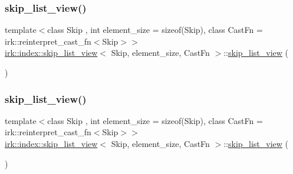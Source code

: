 \subsubsection{\texorpdfstring{skip\+\_\+list\+\_\+view()}{skip\_list\_view()}\hspace{0.1cm}{\footnotesize\ttfamily [1/4]}}
{\footnotesize\ttfamily template$<$class Skip , int element\+\_\+size = sizeof(\+Skip), class Cast\+Fn  = irk\+::reinterpret\+\_\+cast\+\_\+fn$<$\+Skip$>$$>$ \\
\mbox{\hyperlink{classirk_1_1index_1_1skip__list__view}{irk\+::index\+::skip\+\_\+list\+\_\+view}}$<$ Skip, element\+\_\+size, Cast\+Fn $>$\+::\mbox{\hyperlink{classirk_1_1index_1_1skip__list__view}{skip\+\_\+list\+\_\+view}} (\begin{DoxyParamCaption}{ }\end{DoxyParamCaption})\hspace{0.3cm}{\ttfamily [default]}}

\mbox{\label{classirk_1_1index_1_1skip__list__view_ab77d6c40db66d837d83675767b25f6f8}} 
\subsubsection{\texorpdfstring{skip\+\_\+list\+\_\+view()}{skip\_list\_view()}\hspace{0.1cm}{\footnotesize\ttfamily [2/4]}}
{\footnotesize\ttfamily template$<$class Skip , int element\+\_\+size = sizeof(\+Skip), class Cast\+Fn  = irk\+::reinterpret\+\_\+cast\+\_\+fn$<$\+Skip$>$$>$ \\
\mbox{\hyperlink{classirk_1_1index_1_1skip__list__view}{irk\+::index\+::skip\+\_\+list\+\_\+view}}$<$ Skip, element\+\_\+size, Cast\+Fn $>$\+::\mbox{\hyperlink{classirk_1_1index_1_1skip__list__view}{skip\+\_\+list\+\_\+view}} (\begin{DoxyParamCaption}\item[{const \mbox{\hyperlink{classirk_1_1index_1_1skip__list__view}{skip\+\_\+list\+\_\+view}}$<$ Skip, element\+\_\+size, Cast\+Fn $>$ \&}]{ }\end{DoxyParamCaption})\hspace{0.3cm}{\ttfamily [default]}}

